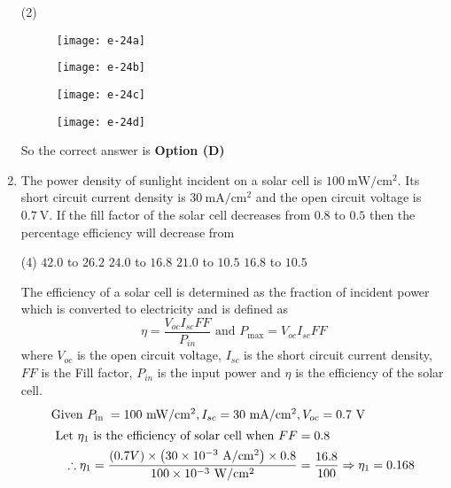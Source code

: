 \begin{enumerate}
{	}
\begin{tasks}(2)
\task[\textbf{A.}] \begin{figure}[H]
	\centering
	\texttt{[image: e-24a]}
\end{figure}
\task[\textbf{B.}] \begin{figure}[H]
	\centering
	\texttt{[image: e-24b]}
\end{figure}
\task[\textbf{C.}] \begin{figure}[H]
	\centering
	\texttt{[image: e-24c]}
\end{figure}
\task[\textbf{D.}] \begin{figure}[H]
	\centering
	\texttt{[image: e-24d]}
\end{figure}
\end{tasks}
\begin{answer}
So the correct answer is \textbf{Option (D)}
\end{answer}
	\item The power density of sunlight incident on a solar cell is $100 \mathrm{~mW} / \mathrm{cm}^{2}$. Its short circuit current density is $30 \mathrm{~mA} / \mathrm{cm}^{2}$ and the open circuit voltage is $0.7 \mathrm{~V}$. If the fill factor of the solar cell decreases from $0.8$ to $0.5$ then the percentage efficiency will decrease from
	{}
\begin{tasks}(4)
\task[\textbf{A.}] $42.0$ to $26.2$
\task[\textbf{B.}] $24.0$ to $16.8$
\task[\textbf{C.}] $21.0$ to $10.5$
\task[\textbf{D.}] $16.8$ to $10.5$
\end{tasks}
\begin{answer}$\left. \right. $\\
The efficiency of a solar cell is determined as the fraction of incident power which is converted to electricity and is defined as
$$
\eta=\frac{V_{o c} I_{s c} F F}{P_{i n}} \text { and } P_{\max }=V_{o c} I_{s c} F F
$$
where $V_{o c}$ is the open circuit voltage, $I_{s c}$ is the short circuit current density, $F F$ is the Fill factor, $P_{i n}$ is the input power and $\eta$ is the efficiency of the solar cell.
\begin{align*}
\intertext{Given $P_{\text {in }}=100 \mathrm{~mW} / \mathrm{cm}^{2}, I_{s c}=30 \mathrm{~mA} / \mathrm{cm}^{2}, V_{o c}=0.7 \mathrm{~V}$}
\text{	Let $\eta_{1}$ is the efficiency of solar cell when $F$} F&=0.8\\
\therefore \eta_{1}=\frac{(0.7 V) \times\left(30 \times 10^{-3} \mathrm{~A} / \mathrm{cm}^{2}\right) \times 0.8}{100 \times 10^{-3} \mathrm{~W} / \mathrm{cm}^{2}}&=\frac{16.8}{100} \Rightarrow \eta_{1}=0.168\\

\end{align*}
\end{answer}
\end{enumerate}
